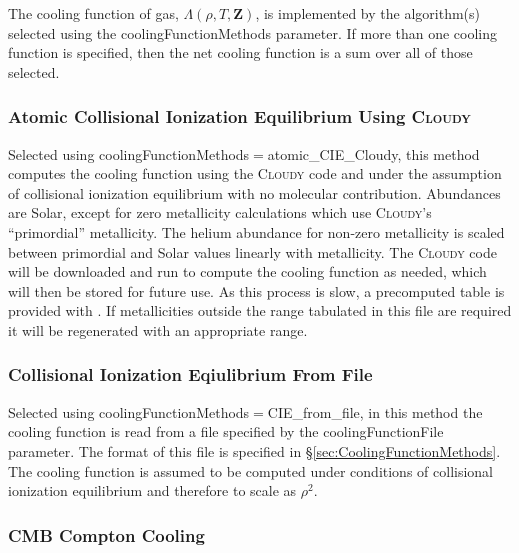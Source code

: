 The cooling function of gas, $\Lambda(\rho,T,{\mathbf Z})$, is implemented by the algorithm(s) selected using the {\normalfont \ttfamily coolingFunctionMethods} parameter. If more than one cooling function is specified, then the net cooling function is a sum over all of those selected.

\subsubsection{Atomic Collisional Ionization Equilibrium Using {\normalfont \scshape Cloudy}}

Selected using {\normalfont \ttfamily coolingFunctionMethods}$=${\normalfont \ttfamily atomic\_CIE\_Cloudy}, this method computes the cooling function using the {\normalfont \scshape Cloudy} code and under the assumption of collisional ionization equilibrium with no molecular contribution. Abundances are Solar, except for zero metallicity calculations which use {\normalfont \scshape Cloudy}'s ``primordial'' metallicity. The helium abundance for non-zero metallicity is scaled between primordial and Solar values linearly with metallicity. The {\normalfont \scshape Cloudy} code will be downloaded and run to compute the cooling function as needed, which will then be stored for future use. As this process is slow, a precomputed table is provided with \glc. If metallicities outside the range tabulated in this file are required it will be regenerated with an appropriate range.

\subsubsection{Collisional Ionization Eqiulibrium From File}

Selected using {\normalfont \ttfamily coolingFunctionMethods}$=${\normalfont \ttfamily CIE\_from\_file}, in this method the cooling function is read from a file specified by the {\normalfont \ttfamily coolingFunctionFile} parameter. The format of this file is specified in \S\ref{sec:CoolingFunctionMethods}. The cooling function is assumed to be computed under conditions of collisional ionization equilibrium and therefore to scale as $\rho^2$.

\subsubsection{CMB Compton Cooling}

